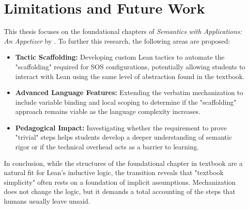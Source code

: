 \section{Limitations and Future Work}
This thesis focuses on the foundational chapters of \emph{Semantics with Applications: An Appetizer} by \cite{nielson_semantics_2007}.
To further this research, the following areas are proposed:
\begin{itemize}
    \item \textbf{Tactic Scaffolding:}
    Developing custom Lean tactics to automate the "scaffolding"
    required for SOS configurations, potentially allowing students
    to interact with Lean using the same level of abstraction found
    in the textbook.

    \item \textbf{Advanced Language Features:}
    Extending the verbatim mechanization to include variable binding
    and local scoping to determine if the "scaffolding" approach remains
    viable as the language complexity increases.

    \item \textbf{Pedagogical Impact:}
    Investigating whether the requirement to prove "trivial" steps
    helps students develop a deeper understanding of semantic rigor
    or if the technical overhead acts as a barrier to learning.
\end{itemize}

\noindent
In conclusion, while the structures of the foundational chapter in \cite{nielson_semantics_2007} textbook are a
natural fit for Lean's inductive logic, the transition reveals that
"textbook simplicity" often rests on a foundation of implicit assumptions.
Mechanization does not change the logic, but it demands a total accounting
of the steps that humans usually leave unsaid.

